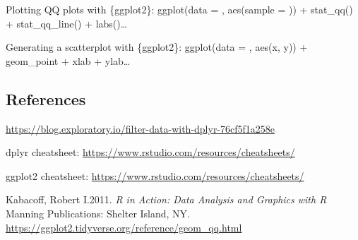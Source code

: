 \documentclass[]{article}
\begin{document}
Plotting QQ plots with \{ggplot2\}: ggplot(data = , aes(sample = )) +
stat\_qq() + stat\_qq\_line() + labs()\ldots{}

Generating a scatterplot with \{ggplot2\}: ggplot(data = , aes(x, y)) +
geom\_point + xlab + ylab\ldots{}

\subsection{References}\label{references}

\url{https://blog.exploratory.io/filter-data-with-dplyr-76cf5f1a258e}

dplyr cheatsheet: \url{https://www.rstudio.com/resources/cheatsheets/}

ggplot2 cheatsheet: \url{https://www.rstudio.com/resources/cheatsheets/}

Kabacoff, Robert I.2011. \emph{R in Action: Data Analysis and Graphics
with R} Manning Publications: Shelter Island, NY.\\
\url{https://ggplot2.tidyverse.org/reference/geom_qq.html}
\end{document}
